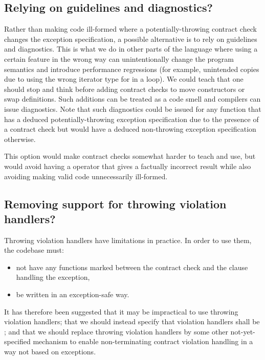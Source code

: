 \subsection{Relying on guidelines and diagnostics?}

Rather than making code ill-formed where a potentially-throwing contract check changes the exception specification, a possible alternative is to rely on guidelines and diagnostics. This is what we do in other parts of the language where using a certain feature in the wrong way can unintentionally change the program semantics and introduce performance regressions (for example, unintended copies due to using the wrong iterator type for  in a loop). We could teach that one should stop and think before adding contract checks to move constructors or swap definitions. Such additions can be treated as a code smell and compilers can issue diagnostics. Note that such diagnostics could be issued for any function that has a deduced potentially-throwing exception specification due to the presence of a contract check but would have a deduced non-throwing exception specification otherwise.

This option would make contract checks somewhat harder to teach and use, but would avoid having a  operator that gives a factually incorrect result while also avoiding making valid code unnecessarily ill-formed.

\subsection{Removing support for throwing violation handlers?}

Throwing violation handlers have limitations in practice. In order to use them, the codebase must:
\begin{itemize}
\item not have any functions marked  between the contract check and the  clause handling the exception,
\item be written in an exception-safe way.
\end{itemize}
It has therefore been suggested that it may be impractical to use throwing violation handlers; that we should instead specify that violation handlers shall be ; and that we should replace throwing violation handlers by some other not-yet-specified mechanism to enable non-terminating contract violation handling in a way not based on exceptions.

